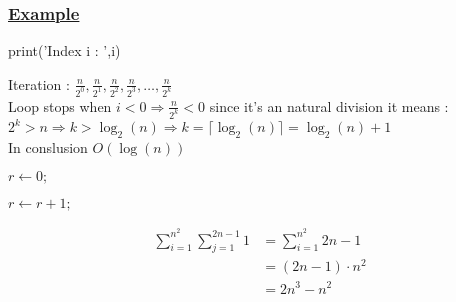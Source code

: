 \newpage

\subsubsection*{\underline{Example}}

\begin{algorithm}[ht]
\caption{}
\begin{algorithmic}
\State \textcolor{purplePlot!80!black}{print}(\textcolor{blueArea!60!black}{'Index i : '},i) 
\EndFor
\end{algorithmic}
\end{algorithm}

Iteration : 
\(\frac{n}{2^0},\frac{n}{2^1},\frac{n}{2^2},\frac{n}{2^3},\dots,\frac{n}{2^k}\)\\[0.25cm]
Loop stops when \(i < 0 \Rightarrow \frac{n}{2^k} < 0\)
since it's an natural division it means :
\(2^k > n \Longrightarrow k > \log_{2}(n) \Longrightarrow k= \lceil \log_{2}(n) \rceil = \boxed{\log_{2}(n) + 1 } \)\\[0.25cm]
In conslusion \(O(\log(n))\)

\vspace{0.75cm}
\begin{algorithm}[ht]
\caption{}
\begin{algorithmic}
\State \(r \gets 0;\)

\State \(r\gets r+1;\)
\EndFor
\EndFor
\end{algorithmic}
\end{algorithm}

\begin{align*}
\sum_{i=1}^{n^2} \sum_{j=1}^{2n-1} 1 &=\sum_{i=1}^{n^2} 2n-1\\
                                     &=(2n-1)\cdot n^2\\
                                     &=\boxed{2n^3 - n^2}
\end{align*}

